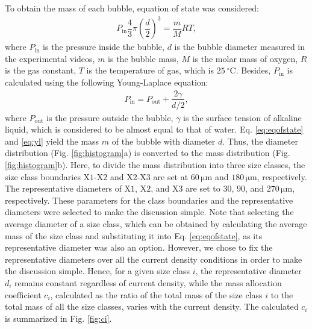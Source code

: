 \documentclass[3p, twocolumn, 10pt]{elsarticle}
\begin{document}
To obtain the mass of each bubble, equation of state was considered:
\begin{align}\label{eq:eqofstate}
  P_{\mathrm{in}}\dfrac{4}{3}\pi
  \left(
  \dfrac{d}{2}
  \right)^3 =
  \dfrac{m}{M}RT,
\end{align}
where $P_{\mathrm{in}}$ is the pressure inside the bubble, $d$ is the bubble diameter measured in the experimental videos, $m$ is the bubble mass, $M$ is the molar mass of oxygen, $R$ is the gas constant, $T$ is the temperature of gas, which is $25\ ^\circ\mathrm{C}$.
Besides, $P_{\mathrm{in}}$ is calculated using the following Young-Laplace equation:
\begin{align}\label{eq:yl}
  P_{\mathrm{in}}=P_{\mathrm{out}}
  +\dfrac{2\gamma}{d/2},
\end{align}
where $P_{\mathrm{out}}$ is the pressure outside the bubble, $\gamma$ is the surface tension of alkaline liquid, which is considered to be almost equal to that of water.
Eq. \ref{eq:eqofstate} and \ref{eq:yl} yield the mass $m$ of the bubble with diameter $d$.
Thus, the diameter distribution (Fig. \ref{fig:histogram}a) is converted to the mass distribution (Fig. \ref{fig:histogram}b).
Here, to divide the mass distribution into three size classes, the size class boundaries $\mathrm{X1}\textit{-}\mathrm{X2}$ and $\mathrm{X2}\textit{-}\mathrm{X3}$ are set at $60\,\si{\micro\metre}$ and $180\,\si{\micro\metre}$, respectively.
The representative diameters of $\mathrm{X1}$, $\mathrm{X2}$, and $\mathrm{X3}$ are set to $30$, $90$, and $270\,\si{\micro\metre}$, respectively.
These parameters for the class boundaries and the representative diameters were selected to make the discussion simple.
Note that selecting the average diameter of a size class, which can be obtained by calculating the average mass of the size class and substituting it into Eq. \ref{eq:eqofstate}, as its representative diameter was also an option.
However, we chose to fix the representative diameters over all the current density conditions in order to make the discussion simple.
Hence, for a given size class $i$, the representative diameter $d_{i}$ remains constant regardless of current density, while the mass allocation coefficient $c_{i}$, calculated as the ratio of the total mass of the size class $i$ to the total mass of all the size classes, varies with the current density.
The calculated $c_{i}$ is summarized in Fig. \ref{fig:ci}.
\end{document}
